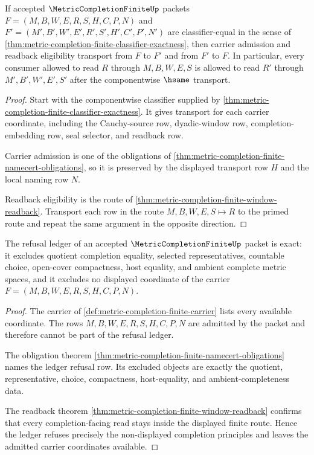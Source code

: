\begin{theorem}
\label{thm:metric-completion-finite-stability-transport}
If accepted $\MetricCompletionFiniteUp$ packets $F=(M,B,W,E,R,S,H,C,P,N)$ and $F'=(M',B',W',E',R',S',H',C',P',N')$ are classifier-equal in the sense of \autoref{thm:metric-completion-finite-classifier-exactness}, then carrier admission and readback eligibility transport from $F$ to $F'$ and from $F'$ to $F$. In particular, every consumer allowed to read $R$ through $M,B,W,E,S$ is allowed to read $R'$ through $M',B',W',E',S'$ after the componentwise $\hsame$ transport.
\end{theorem}
\begin{proof}
Start with the componentwise classifier supplied by \autoref{thm:metric-completion-finite-classifier-exactness}. It gives transport for each carrier coordinate, including the Cauchy-source row, dyadic-window row, completion-embedding row, seal selector, and readback row.

Carrier admission is one of the obligations of \autoref{thm:metric-completion-finite-namecert-obligations}, so it is preserved by the displayed transport row $H$ and the local naming row $N$.

Readback eligibility is the route of \autoref{thm:metric-completion-finite-window-readback}. Transport each row in the route $M,B,W,E,S \longmapsto R$ to the primed route and repeat the same argument in the opposite direction.
\end{proof}

\begin{theorem}
\label{thm:metric-completion-finite-ledger-exactness}
The refusal ledger of an accepted $\MetricCompletionFiniteUp$ packet is exact: it excludes quotient completion equality, selected representatives, countable choice, open-cover compactness, host equality, and ambient complete metric spaces, and it excludes no displayed coordinate of the carrier $F=(M,B,W,E,R,S,H,C,P,N)$.
\end{theorem}
\begin{proof}
The carrier of \autoref{def:metric-completion-finite-carrier} lists every available coordinate. The rows $M,B,W,E,R,S,H,C,P,N$ are admitted by the packet and therefore cannot be part of the refusal ledger.

The obligation theorem \autoref{thm:metric-completion-finite-namecert-obligations} names the ledger refusal row. Its excluded objects are exactly the quotient, representative, choice, compactness, host-equality, and ambient-completeness data.

The readback theorem \autoref{thm:metric-completion-finite-window-readback} confirms that every completion-facing read stays inside the displayed finite route. Hence the ledger refuses precisely the non-displayed completion principles and leaves the admitted carrier coordinates available.
\end{proof}

